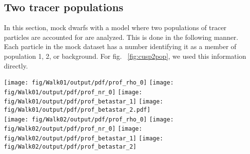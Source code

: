 \subsection{Two tracer populations}

In this section, mock dwarfs with a model where
two populations of tracer particles are accounted
for are analyzed. This is done in the following
manner. Each particle in the mock dataset has a
number identifying it as a member of population 1,
2, or background. For fig.  ~\ref{fig:cusp2pop},
we used this information directly.

\begin{figure*}
    \begin{center}
        \texttt{[image: fig/Walk01/output/pdf/prof\_rho\_0]}\hspace{-3mm}
        \texttt{[image: fig/Walk01/output/pdf/prof\_nr\_0]}\hspace{-3mm}
        \texttt{[image: fig/Walk01/output/pdf/prof\_betastar\_1]}\hspace{-3mm}
        \texttt{[image: fig/Walk01/output/pdf/prof\_betastar\_2.pdf]}\\

        \texttt{[image: fig/Walk02/output/pdf/prof\_rho\_0]}\hspace{-3mm}
        \texttt{[image: fig/Walk02/output/pdf/prof\_nr\_0]}\hspace{-3mm}
        \texttt{[image: fig/Walk02/output/pdf/prof\_betastar\_1]}\hspace{-3mm}
        \texttt{[image: fig/Walk02/output/pdf/prof\_betastar\_2]}\\

        \caption{Reconstructed density and density
          slope for the 2pop core model (top)
          and 2pop cusp model (bottom), with
          two tracer populations with half light
          radii marked by the vertical green
          lines. Lines are as in Figure
          \ref{fig:singlepop}. We encorporated a $\beta*(r)\geq0$
          prior here to speed up convergence.}
        \label{fig:cusp2pop}
    \end{center}
\end{figure*}

